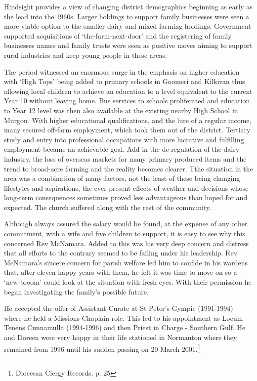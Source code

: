 Hindsight provides a view of changing district demographics beginning as early as the lead into the 1960s. Larger holdings to support family businesses were seen a more viable option to the smaller dairy and mixed farming holdings. Government supported acquisitions of `the-farm-next-door' and the registering of family businesses names and family trusts were seen as positive moves aiming to support rural industries and keep young people in these areas.



The period witnessed an enormous surge in the emphasis on higher education with `High Tops' being added to primary schools in Goomeri and Kilkivan thus allowing local children to achieve an education to a level equivalent to the current Year 10 without leaving home. Bus services to schools proliferated and education to Year 12 level was then also available at the existing nearby High School in Murgon. With higher educational qualifications, and the lure of a regular income, many secured off-farm employment, which took them out of the district. Tertiary study and entry into professional occupations with more lucrative and fulfilling employment became an achievable goal. Add in the de-regulation of the dairy industry, the loss of overseas markets for many primary produced items and the trend to broad-acre farming and the reality becomes clearer. Tthe situation in the area was a combination of many factors, not the least of these being changing lifestyles and aspirations, the ever-present effects of weather and decisions whose long-term consequences sometimes proved less advantageous than hoped for and expected. The church suffered along with the rest of the community.



Although always assured the salary would be found, at the expense of any other commitment, with a wife and five children to support, it is easy to see why this concerned Rev McNamara. Added to this was his very deep concern and distress that all efforts to the contrary seemed to be failing under his leadership. Rev McNamara's sincere concern for parish welfare led him to confide in his wardens that, after eleven happy years with them, he felt it was time to move on so a `new-broom' could look at the situation with fresh eyes. With their permission he began investigating the family's possible future.



He accepted the offer of Assistant Curate at St Peter's Gympie (1991-1994) where he held a Missions Chaplain role. This led to his appointment as Locum Tenens Cunnamulla (1994-1996) and then Priest in Charge - Southern Gulf. He and Doreen were very happy in their life stationed in Normanton where they remained from 1996 until his sudden passing on 20 March 2001.\footnote{Diocesan Clergy Records, p. 25}


